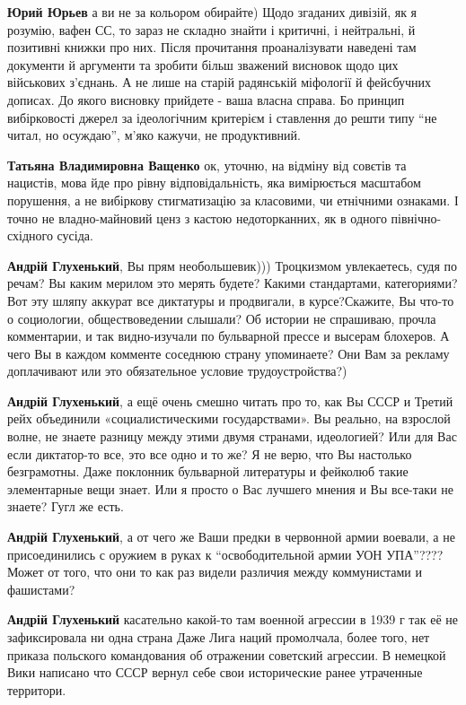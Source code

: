 \begin{itemize}
\begin{itemize}

\textbf{Юрий Юрьев} а ви не за кольором обирайте) Щодо згаданих дивізій, як я
розумію, вафен СС, то зараз не складно знайти і критичні, і нейтральні, й
позитивні книжки про них. Після прочитання проаналізувати наведені там
документи й аргументи та зробити більш зважений висновок щодо цих військових
з'єднань. А не лише на старій радянській міфології й фейсбучних дописах. До
якого висновку прийдете - ваша власна справа. Бо принцип вибірковості джерел за
ідеологічним критерієм і ставлення до решти типу \enquote{не читал, но осуждаю}, м'яко
кажучи, не продуктивний.

\textbf{Татьяна Владимировна Ващенко} ок, уточню, на відміну від совєтів та
нацистів, мова йде про рівну відповідальність, яка вимірюється масштабом
порушення, а не вибіркову стигматизацію за класовими, чи етнічними ознаками. І
точно не владно-майновий ценз з кастою недоторканних, як в одного
північно-східного сусіда.

\textbf{Андрій Глухенький}, Вы прям необольшевик))) Троцкизмом увлекаетесь,
судя по речам? Вы каким мерилом это мерять будете? Какими стандартами,
категориями? Вот эту шляпу аккурат все диктатуры и продвигали, в курсе?Скажите,
Вы что-то о социологии, обществоведении слышали? Об истории не спрашиваю,
прочла комментарии, и так видно-изучали по бульварной прессе и высерам
блохеров.  А чего Вы в каждом комменте соседнюю страну упоминаете? Они Вам за
рекламу доплачивают или это обязательное условие трудоустройства?)

\textbf{Андрій Глухенький}, а ещё очень смешно читать про то, как Вы СССР и
Третий рейх объединили «социалистическими государствами». Вы реально, на
взрослой волне, не знаете разницу между этими двумя странами, идеологией? Или
для Вас если диктатор-то все, это все одно и то же? Я не верю, что Вы настолько
безграмотны. Даже поклонник бульварной литературы и фейколюб такие элементарные
вещи знает. Или я просто о Вас лучшего мнения и Вы все-таки не знаете? Гугл же
есть.

\textbf{Андрій Глухенький}, а от чего же Ваши предки в червонной армии воевали,
а не присоединились с оружием в руках к \enquote{освободительной армии УОН УПА}????
Может от того, что они то как раз видели различия между коммунистами и
фашистами?

\textbf{Андрій Глухенький} касательно какой-то там военной агрессии в 1939 г
так её не зафиксировала ни одна страна Даже Лига наций промолчала, более того,
нет приказа польского командования об отражении советский агрессии. В немецкой
Вики написано что СССР вернул себе свои исторические ранее утраченные
территори.


\end{itemize}
\end{itemize}
